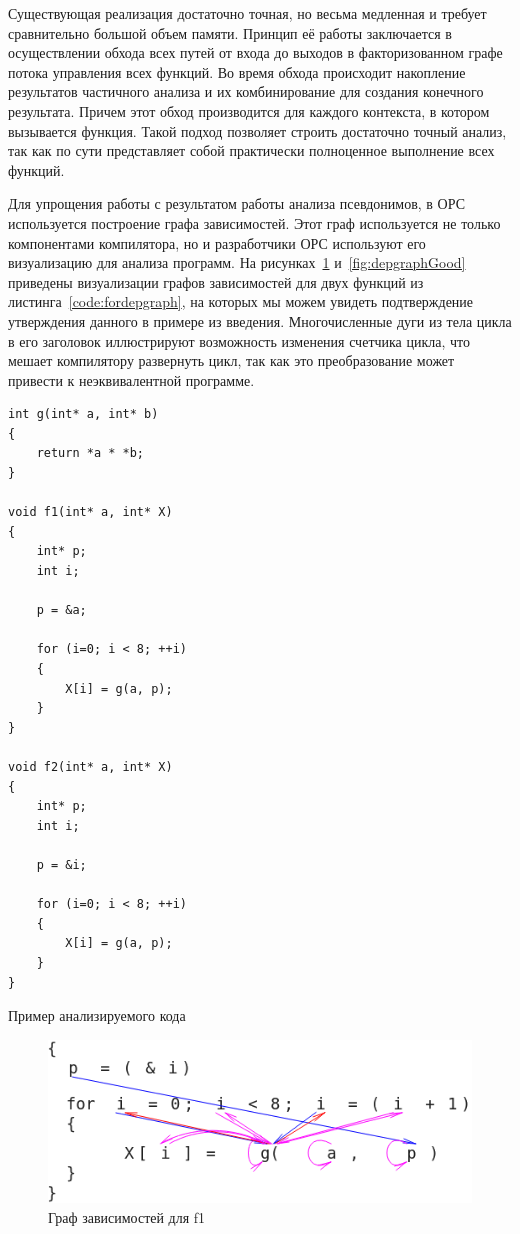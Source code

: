 Существующая реализация достаточно точная, но весьма медленная и требует сравнительно большой объем памяти. Принцип её работы заключается в осуществлении обхода всех путей от входа до выходов в факторизованном графе потока управления всех функций. Во время обхода происходит накопление результатов частичного анализа и их комбинирование для создания конечного результата. Причем этот обход производится для каждого контекста, в котором вызывается функция. Такой подход позволяет строить достаточно точный анализ, так как по сути представляет собой практически полноценное выполнение всех функций.

Для упрощения работы с результатом работы анализа псевдонимов, в ОРС используется построение графа зависимостей. Этот граф используется не только компонентами компилятора, но и разработчики ОРС используют его визуализацию для анализа программ. На рисунках~\ref{fig:depgraphBad} и~\ref{fig:depgraphGood} приведены визуализации графов зависимостей для двух функций из листинга~\ref{code:fordepgraph}, на которых мы можем увидеть подтверждение утверждения данного в примере из введения. Многочисленные дуги из тела цикла в его заголовок иллюстрируют возможность изменения счетчика цикла, что мешает компилятору развернуть цикл, так как это преобразование может привести к неэквивалентной программе.

\begin{ListingEnv}[H]
\begin{lstlisting}
int g(int* a, int* b)
{
    return *a * *b;
}

void f1(int* a, int* X)
{
    int* p;
    int i;
    
    p = &a;

    for (i=0; i < 8; ++i)
    {
        X[i] = g(a, p);
    }
}

void f2(int* a, int* X)
{
    int* p;
    int i;
    
    p = &i;

    for (i=0; i < 8; ++i)
    {
        X[i] = g(a, p);
    }
}
\end{lstlisting}
\caption{Пример анализируемого кода}
\label{code:fordepgraph}
\end{ListingEnv}

\begin{figure}[H]
\centering
\includegraphics[width=1\textwidth]{img/opsDepGraphBad_alpha.png}
\caption{Граф зависимостей для f1}
\label{fig:depgraphBad}
\end{figure}

